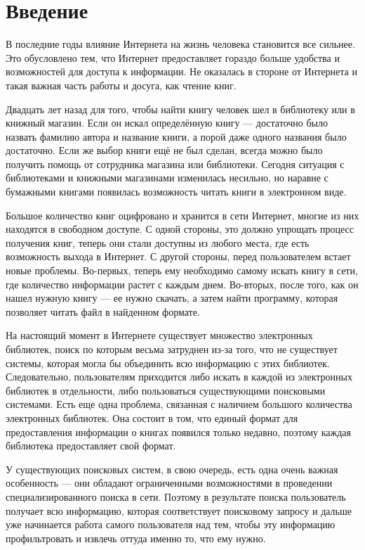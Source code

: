 
\section{Введение}
В последние годы влияние Интернета на жизнь человека становится все сильнее. Это обусловлено тем, что Интернет предоставляет гораздо больше удобства и возможностей для доступа к информации. Не оказалась в стороне от Интернета и такая важная часть работы и досуга, как чтение книг.

Двадцать лет назад для того, чтобы найти книгу человек шел в библиотеку или в книжный магазин. Если он искал определённую книгу --- достаточно было назвать фамилию автора и название книги, а порой даже одного названия было достаточно. Если же выбор книги ещё не был сделан, всегда можно было получить помощь от сотрудника магазина или библиотеки. Сегодня ситуация с библиотеками и книжными магазинами изменилась несильно, но наравне с бумажными книгами появилась возможность читать книги в электронном виде. 

Большое количество книг оцифровано и хранится в сети Интернет, многие из них находятся в свободном доступе. С одной стороны, это должно упрощать процесс получения книг, \tk теперь они стали доступны из любого места, где есть возможность выхода в Интернет. С другой стороны, перед пользователем встает новые проблемы. Во-первых, теперь ему необходимо самому искать книгу в сети, где количество информации растет с каждым днем. Во-вторых, после того, как он нашел нужную книгу --- ее нужно скачать, а затем найти программу, которая позволяет читать файл в найденном формате. 

На настоящий момент в Интернете существует множество электронных библиотек, поиск по которым весьма затруднен из-за того, что не существует системы, которая могла бы объединить всю информацию с этих библиотек. Следовательно, пользователям приходится либо искать в каждой из электронных библиотек в отдельности, либо пользоваться существующими поисковыми системами. Есть еще одна проблема, связанная с наличием большого количества электронных библиотек. Она состоит в том, что единый формат для предоставления информации о книгах появился только недавно, поэтому каждая библиотека предоставляет свой формат.

У существующих поисковых систем, в свою очередь,  есть одна очень важная особенность --- они обладают ограниченными возможностями в проведении специализированного поиска в сети. Поэтому в результате поиска пользователь получает всю информацию, которая соответствует поисковому запросу и дальше уже начинается работа самого пользователя над тем, чтобы эту информацию профильтровать и извлечь оттуда именно то, что ему нужно. 

